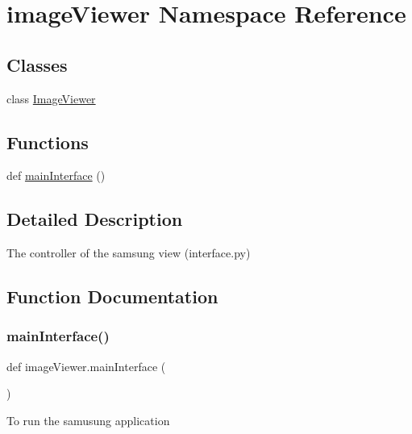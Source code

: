 \hypertarget{namespaceimage_viewer}{}\section{image\+Viewer Namespace Reference}
\label{namespaceimage_viewer}
\subsection*{Classes}
\begin{DoxyCompactItemize}
\item 
class \hyperlink{classimage_viewer_1_1_image_viewer}{Image\+Viewer}
\end{DoxyCompactItemize}
\subsection*{Functions}
\begin{DoxyCompactItemize}
\item 
def \hyperlink{namespaceimage_viewer_a3f8123200e22d4933a0f923a50ab50d8}{main\+Interface} ()
\end{DoxyCompactItemize}


\subsection{Detailed Description}
\begin{DoxyVerb}The controller of the samsung view (interface.py)
\end{DoxyVerb}
 

\subsection{Function Documentation}
\mbox{\label{namespaceimage_viewer_a3f8123200e22d4933a0f923a50ab50d8}} 
\subsubsection{\texorpdfstring{main\+Interface()}{mainInterface()}}
{\footnotesize\ttfamily def image\+Viewer.\+main\+Interface (\begin{DoxyParamCaption}{ }\end{DoxyParamCaption})}

\begin{DoxyVerb}   To run the samusung application
\end{DoxyVerb}
 